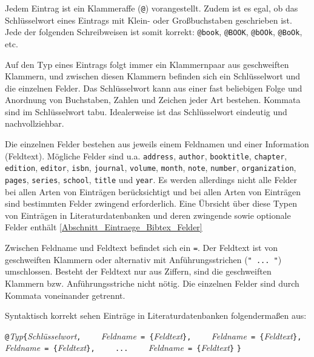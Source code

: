 \documentclass[a4paper,10pt,twoside]{scrbook}
\begin{document}
Jedem Eintrag ist ein Klammeraffe (\verb!@!) vorangestellt. Zudem ist es egal, ob das Schlüsselwort eines
Eintrags mit Klein- oder Großbuchstaben 
geschrieben ist. Jede der folgenden Schreibweisen ist somit korrekt: \verb!@book!, \verb!@BOOK!, 
\verb!@bOOk!, \verb!@BoOk!, etc.

Auf den Typ eines Eintrags folgt immer ein Klammernpaar 
aus geschweiften Klammern, und
zwischen diesen Klammern befinden sich ein Schlüsselwort und 
die einzelnen Felder.
Das Schlüsselwort kann aus einer fast beliebigen
Folge und Anordnung von Buchstaben, 
Zahlen und Zeichen jeder Art bestehen. 
Kommata sind im Schlüsselwort tabu. 
Idealerweise ist das Schlüsselwort eindeutig 
und nachvollziehbar.

Die einzelnen Felder bestehen 
aus jeweils einem Feldnamen
und einer Information (Feldtext).
Mögliche Felder sind u.a. \texttt{address}, \texttt{author}, \texttt{booktitle}, \texttt{chapter}, \texttt{edition}, \texttt{editor}, \texttt{isbn}, \texttt{journal}, \texttt{volume}, \texttt{month}, \texttt{note}, \texttt{number}, \texttt{organization}, \texttt{pages}, \texttt{series}, \texttt{school}, \texttt{title} und \texttt{year}. Es werden allerdings nicht alle Felder bei allen Arten von Einträgen berücksichtigt und bei allen Arten von Einträgen sind bestimmten Felder zwingend erforderlich. Eine Übrsicht über diese Typen von Einträgen in Literaturdatenbanken und deren zwingende sowie optionale Felder enthält \ref{Abschnitt_Eintraege_Bibtex_Felder}

Zwischen Feldname und Feldtext befindet sich ein \verb!=!. Der Feldtext ist von geschweiften Klammern oder alternativ mit Anführungsstrichen (\verb!" ... "!) umschlossen. Besteht der Feldtext nur aus Ziffern, sind die geschweiften Klammern bzw. Anführungsstriche nicht nötig.
Die einzelnen Felder sind durch Kommata voneinander getrennt.

Syntaktisch korrekt sehen Einträge in Literaturdatenbanken folgendermaßen aus: 


\begin{boxedminipage}{\textwidth}
\verb!@!\textsl{Typ}\verb!{!\textsl{Schlüsselwort}\verb!,!\newline
\verb!    !\textsl{Feldname}\verb! = {!\textsl{Feldtext}\verb!},! \newline
\verb!    !\textsl{Feldname}\verb! = {!\textsl{Feldtext}\verb!},! \newline
\verb!    !\textsl{Feldname}\verb! = {!\textsl{Feldtext}\verb!},! \newline
\verb!    !\verb!...! \newline
\verb!    !\textsl{Feldname}\verb! = {!\textsl{Feldtext}\verb!}! \newline
\verb!}!
\end{boxedminipage}
\end{document}
